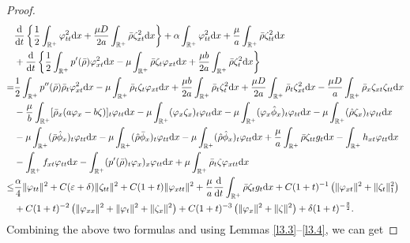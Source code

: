 \documentclass[11pt]{article}
\theoremstyle{plain}
\numberwithin{equation}{section}
\begin{document}
\begin{proof}
\begin{align}\label{421k1}
			&\frac{{\rm d}}{{\rm d}t}\left\{\frac{1}{2}\int_{\mathbb{R}^+}\varphi_{tt}^2{\rm d}x	+\frac{\mu D}{2a}\int_{\mathbb{R}^+}^{}\bar\rho\zeta_{xt}^2{\rm d}x\right\}+\alpha\int_{\mathbb{R}^+}\varphi_{tt}^2{\rm d}x+\frac{\mu}{a}\int_{\mathbb{R}^+}^{}\bar\rho\zeta_{tt}^2{\rm d}x\notag\\
			&+\frac{{\rm d}}{{\rm d}t}\left\{\frac{1}{2}\int_{\mathbb{R}^+}p^{\prime}(\bar\rho)\varphi_{xt}^2{\rm d}x-\mu\int_{\mathbb{R}^+}\bar\rho\zeta_t \varphi_{xt}{\rm d}x+\frac{\mu b}{2a}\int_{\mathbb{R}^+}^{}\bar\rho\zeta_t^2{\rm d}x\right\}\notag\\
			=&\frac{1}{2}\int_{\mathbb{R}^+}p^{\prime\prime}(\bar\rho)\bar\rho_t\varphi_{xt}^2{\rm d}x-\mu\int_{\mathbb{R}^+}\bar\rho_t\zeta_t \varphi_{xt}{\rm d}x+\frac{\mu b}{2a}\int_{\mathbb{R}^+}^{}\bar\rho_t\zeta_t^2{\rm d}x	
			+\frac{\mu D}{2a}\int_{\mathbb{R}^+}^{}\bar\rho_t\zeta_{xt}^2{\rm d}x
			-\frac{\mu D}{a}\int_{\mathbb{R}^+}^{}\bar\rho_x\zeta_{xt}\zeta_{tt} {\rm d}x\notag\\
			&-\frac{\mu}{b}\int_{\mathbb{R}^+}[\bar\rho_x(a\varphi_x-b\zeta)]_t\varphi_{tt}{\rm d}x-\mu\int_{\mathbb{R}^+}(\varphi_x\zeta_x)_t\varphi_{tt}{\rm d}x-\mu\int_{\mathbb{R}^+}(\varphi_x\hat\phi_x)_t\varphi_{tt}{\rm d}x-\mu\int_{\mathbb{R}^+}(\hat\rho\zeta_x)_t\varphi_{tt}{\rm d}x\notag\\
			&-\mu\int_{\mathbb{R}^+}(\bar\rho\hat\phi_x)_t\varphi_{tt}{\rm d}x-\mu\int_{\mathbb{R}^+}(\hat\rho\bar\phi_x)_t\varphi_{tt}{\rm d}x-\mu\int_{\mathbb{R}^+}(\hat\rho\hat\phi_x)_t\varphi_{tt}{\rm d}x+\frac{\mu}{a}\int_{\mathbb{R}^+}^{}\bar\rho\zeta_{tt}g_t {\rm d}x-\int_{\mathbb{R}^+}h_{xt}\varphi_{tt}{\rm d}x\notag\\
			&-\int_{\mathbb{R}^+}f_{xt}\varphi_{tt}{\rm d}x-\int_{\mathbb{R}^+}(p^{\prime}(\bar\rho)_t\varphi_{x})_x\varphi_{tt}{\rm d}x+\mu\int_{\mathbb{R}^+}\bar\rho_{t}\zeta \varphi_{xtt}{\rm d}x\notag\\
			\leq&\frac{\alpha}{4}\|\varphi_{tt}\|^2+C(\varepsilon+\delta)\|\zeta_{tt}\|^2+C(1+t)\|\varphi_{xtt}\|^2+\frac{\mu}{a}\frac{{\rm d}}{{\rm d}t}\int_{\mathbb{R}^+}\bar\rho\zeta_t g_t{\rm d}x+C(1+t)^{-1}\left(\|\varphi_{xt}\|^2+\|\zeta_t\|_1^2\right)\notag\\ 
			&+C(1+t)^{-2}\left(\|\varphi_{xx}\|^2+\|\varphi_t\|^2+\|\zeta_x\|^2\right)+C(1+t)^{-3}\left(\|\varphi_x\|^2+\|\zeta\|^2\right)+\delta (1+t)^{-\frac{9}{2}}.
		\end{align}
Combining the above two formulas and using Lemmas \ref{l3.3}--\ref{l3.4}, we can get

\end{proof}
\end{document}
